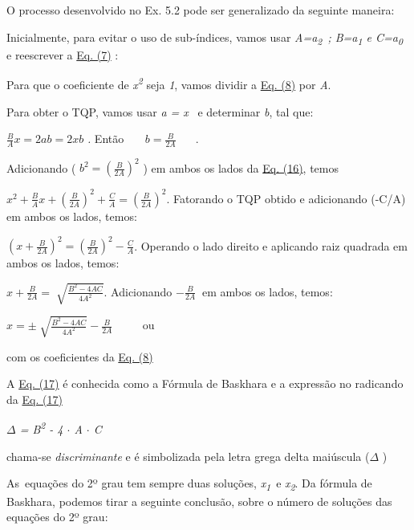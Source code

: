 O processo desenvolvido no Ex. 5.2 pode ser generalizado da seguinte maneira:

Inicialmente, para evitar o uso de sub-índices, vamos usar \textit{A=a\textsubscript{2}~;  B=a\textsubscript{1} e C=a\textsubscript{0}}  e reescrever a  \hyperref[eqc:4.7]{Eq. (7)} :


Para que o coeficiente de \textit{x\textsuperscript{2}} seja \textit{1}, vamos dividir a \hyperref[eqc:4.8]{Eq. (8)} por \textit{A}.


Para obter o TQP, vamos usar \textit{a = x}~ e determinar \textit{b}, tal que:

 \( \frac{B}{A}x=2ab=2xb \) \textit{. }Então\textit{~~~  \( b=\frac{B}{2A} \) ~~ }.

Adicionando ( \( b^{2}= \left( \frac{B}{2A} \right) ^{2} \) ) em ambos os lados da \hyperref[eqc:4.16]{Eq. (16)}, temos

 \( x^{2}+\frac{B}{A}x+ \left( \frac{B}{2A} \right) ^{2}+\frac{C}{A}= \left( \frac{B}{2A} \right) ^{2} \). Fatorando o TQP obtido e adicionando (-C/A) em ambos os lados, temos:

 \(  \left( x+\frac{B}{2A} \right) ^{2}= \left( \frac{B}{2A} \right) ^{2}-\frac{C}{A} \). Operando o lado direito e aplicando raiz quadrada em ambos os lados, temos:

 \( x+\frac{B}{2A}=\sqrt[]{\frac{B^{2}-4AC}{4A^{2}}} \). Adicionando  \( -\frac{B}{2A}~  \) em ambos os lados, temos:

 \( x= \pm \sqrt[]{\frac{B^{2}-4AC}{4A^{2}}}-\frac{B}{2A} \) ~~~~ ou


com os coeficientes da \hyperref[eqc:4.8]{Eq. (8)}

A \hyperref[eqc:4.17]{Eq. (17)} é conhecida como a Fórmula de Baskhara e a expressão no radicando da \hyperref[eqc:4.17]{Eq. (17)}

\textit{$ \Delta $  = B\textsuperscript{2} - 4 $ \cdot $ A $ \cdot $  C}

chama-se \textit{discriminante} e é simbolizada pela letra grega delta maiúscula (\textit{$ \Delta $ })~ \qedsymbol{}

As~equações do 2º grau tem sempre duas soluções,  \textit{x\textsubscript{1}}~e  \textit{x\textsubscript{2}}. Da fórmula de Baskhara, podemos tirar a seguinte conclusão, sobre o número de soluções das equações do 2º grau:

